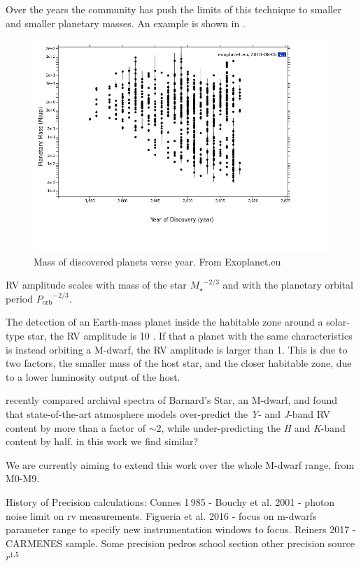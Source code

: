 Over the years the community has push the limits of this technique to smaller and smaller planetary masses. An example is shown in .
\begin{figure}

\includegraphics[width=0.8\linewidth]{figures/year_planet_mass.png}
\caption{Mass of discovered planets verse year. From Exoplanet.eu}
\label{fig:year_mass}
\end{figure}


{RV} amplitude scales with mass of the star \({M_{\star}}^{-2/3}\) and with the planetary orbital period \({P_{\textrm{orb}}}^{-2/3}\).

The detection of an Earth-mass planet inside the habitable zone around a solar-type star, the {RV} amplitude is 10 \cmps{}. If that a planet with the same characteristics is instead orbiting a M-dwarf, the {RV} amplitude is larger than 1\mps{}. This is due to two factors, the smaller mass of the host star, and the closer habitable zone, due to a lower luminosity output of the host.

\citet{artigau_optical_2018} recently compared archival spectra of Barnard's Star, an M-dwarf, and found that state-of-the-art atmosphere models over-predict the \emph{Y}- and \emph{J}-band {RV} content by more than a factor of \(\sim 2\), while under-predicting the \emph{H} and \emph{K}-band content by half.
{\red{} in this work we find similar?}

We are currently aiming to extend this work over the whole M-dwarf range, from {M0}-{M9}.

History of Precision calculations:
Connes 1\,985 -
Bouchy et al. 2001  - photon noise limit on rv measurements.
Figueria et al. 2016 - focus on m-dwarfs parameter range to specify new instrumentation windows to focus.
Reiners 2017 -  {CARMENES} sample. Some precision
pedros school section other precision source \(r^1.5\)


